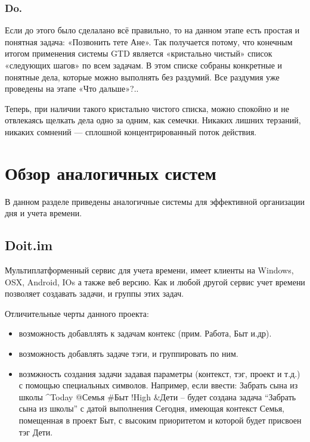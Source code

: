 \subsubsection{Do. }

Если до этого было сделалано всё правильно, то на данном этапе есть простая и понятная задача: «Позвонить тете Ане».
Так получается потому, что конечным итогом применения системы GTD является «кристально чистый» список «следующих шагов» по всем задачам. В этом списке собраны конкретные и понятные дела, которые можно выполнять без раздумий. Все раздумия уже проведены на этапе «Что дальше»?..

Теперь, при наличии такого кристально чистого списка, можно спокойно и не отвлекаясь щелкать дела одно за одним, как семечки. Никаких лишних терзаний, никаких сомнений — сплошной концентрированный поток действия. 

\section{Обзор аналогичных систем} 
\label{sec:practice:analogs}

В данном разделе приведены аналогичные системы для эффективной организации дня и учета времени. 

\subsection{Doit.im}
\label{sub:practice:analogs:doit}
Мультиплатформенный  сервис для учета времени, имеет клиенты на Windows, OSX, Android, IOs а также веб версию. Как и любой другой сервис учет времени позволяет создавать задачи, и группы этих задач.

Отличительные черты данного проекта:

\begin{itemize}
  \item возможность добавллять к задачам контекс (прим. Работа, Быт и.др).
  \item возможность добавлять задаче тэги, и группировать по ним.
  \item возмжность создания задачи задавая параметры (контекст, тэг, проект и т.д.) с помощью специальных символов. Например, если ввести: Забрать сына из школы \string^Today @Семья \#Быт !High \&Дети –  будет создана задача “Забрать сына из школы” с датой выполнения Сегодня, имеющая контекст Семья, помещенная в проект Быт, с высоким приоритетом и которой будет присвоен тэг Дети.
\end{itemize}

